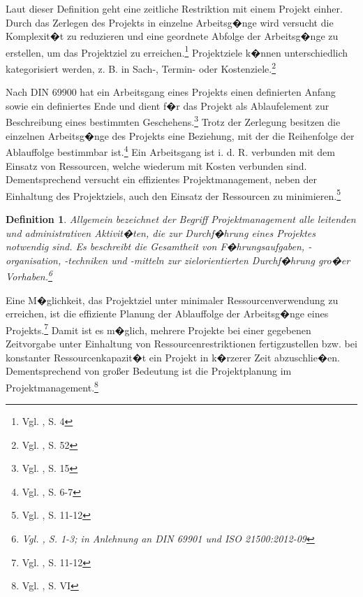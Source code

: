 \documentclass[a4paper,12pt,parskip,bibtotoc,liststotoc]{article}
\newtheorem{mydef}{Definition}
\begin{document}
Laut dieser Definition geht eine zeitliche Restriktion mit einem Projekt einher. Durch das Zerlegen des Projekts in einzelne Arbeitsg�nge wird versucht die Komplexit�t zu reduzieren und eine geordnete Abfolge der Arbeitsg�nge zu erstellen, um das Projektziel zu erreichen.\footnote{Vgl. \cite{zimmermann2006projektplanung}, S. 4} Projektziele k�nnen unterschiedlich kategorisiert werden, z. B. in Sach-, Termin- oder Kostenziele.\footnote{Vgl. \cite{felkai2011analysieren}, S. 52}

Nach DIN 69900 hat ein Arbeitsgang eines Projekts einen definierten Anfang sowie ein definiertes Ende und dient f�r das Projekt als Ablaufelement zur Beschreibung eines bestimmten Geschehens.\footnote{Vgl. \cite{69900D}, S. 15} Trotz der Zerlegung besitzen die einzelnen Arbeitsg�nge des Projekts eine Beziehung, mit der die Reihenfolge der Ablauffolge bestimmbar ist.\footnote{Vgl. \cite{kellenbrink2014einfuhrung}, S. 6-7} %
Ein Arbeitsgang ist i. d. R. verbunden mit dem Einsatz von Ressourcen, welche wiederum mit Kosten verbunden sind. Dementsprechend versucht ein effizientes Projektmanagement, neben der Einhaltung des Projektziels, auch den Einsatz der Ressourcen zu minimieren.\footnote{Vgl. \cite{bartels2009projektplanung}, S. 11-12}

\begin{mydef}
\glqq Allgemein bezeichnet der Begriff Projektmanagement alle leitenden und administrativen Aktivit�ten, die zur Durchf�hrung eines Projektes notwendig sind. Es beschreibt die Gesamtheit von F�hrungsaufgaben, -organi\-sation, -techniken und -mitteln zur zielorientierten Durchf�hrung gro�er Vorhaben.\grqq\footnote{Vgl. \cite{hering2014projektmanagement}, S. 1-3; in Anlehnung an DIN 69901 und ISO 21500:2012-09}
\end{mydef}

Eine M�glichkeit, das Projektziel unter minimaler Ressourcenverwendung zu erreichen, ist die effiziente Planung der Ablauffolge der Arbeitsg�nge eines Projekts.\footnote{Vgl. \cite{bartels2009projektplanung}, S. 11-12} Damit ist es m�glich, mehrere Projekte bei einer gegebenen Zeitvorgabe unter Einhaltung von Ressourcenrestriktionen fertigzustellen bzw. bei konstanter Ressourcenkapazit�t ein Projekt in k�rzerer Zeit abzuschlie�en. Dementsprechend von großer Bedeutung ist die Projektplanung im Projektmanagement.\footnote{Vgl. \cite{zimmermann2006projektplanung}, S. VI\label{zum}}%
\end{document}
